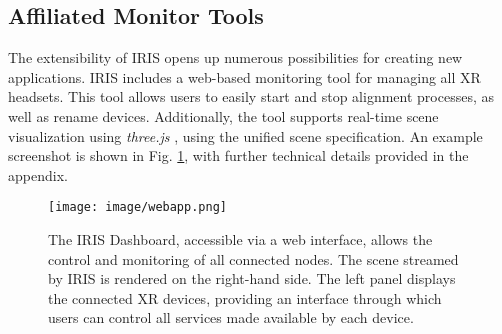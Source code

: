 


\subsection{Affiliated Monitor Tools}
The extensibility of IRIS opens up numerous possibilities for creating new applications. IRIS includes a web-based monitoring tool for managing all XR headsets. This tool allows users to easily start and stop alignment processes, as well as rename devices.
Additionally, the tool supports real-time scene visualization using \textit{three.js} \cite{threejsThreejsDocs}, using the unified scene specification. An example screenshot is shown in Fig. \ref{fig:webapp}, with further technical details provided in the appendix. \textcolor{red}{}

\begin{figure}[h!]
    \centering
    \texttt{[image: image/webapp.png]}
    \caption{
The IRIS Dashboard, accessible via a web interface, 
allows the control and monitoring of all connected nodes. 
The scene streamed by IRIS is rendered on the right-hand side. 
The left panel displays the connected XR devices, 
providing an interface through which users can control all services made available by each device.
    }
    \label{fig:webapp}
\end{figure}



